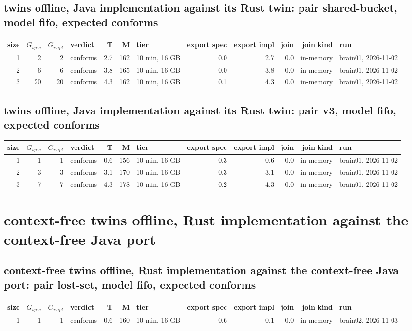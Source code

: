 \documentclass[10pt]{article}
\begin{document}
\subsection*{twins offline, Java implementation against its Rust twin: pair \textsf{shared-bucket}, model fifo, expected conforms}
\begin{longtable}{@{}rrrlrrlrrrrl@{}}
\toprule
size & $G_{\mathit{spec}}$ & $G_{\mathit{impl}}$ & verdict & T & M & tier & export spec & export impl & join & join kind & run \\
\midrule
\endhead
\color{red} 1 & 2 & 2 & conforms & 2.7 & 162 & 10 min, 16 GB & 0.0 & 2.7 & 0.0 & in-memory & brain01, 2026-11-02 \\
\color{red} 2 & 6 & 6 & conforms & 3.8 & 165 & 10 min, 16 GB & 0.0 & 3.8 & 0.0 & in-memory & brain01, 2026-11-02 \\
\color{red} 3 & 20 & 20 & conforms & 4.3 & 162 & 10 min, 16 GB & 0.1 & 4.3 & 0.0 & in-memory & brain01, 2026-11-02 \\
\bottomrule
\end{longtable}
\subsection*{twins offline, Java implementation against its Rust twin: pair \textsf{v3}, model fifo, expected conforms}
\begin{longtable}{@{}rrrlrrlrrrrl@{}}
\toprule
size & $G_{\mathit{spec}}$ & $G_{\mathit{impl}}$ & verdict & T & M & tier & export spec & export impl & join & join kind & run \\
\midrule
\endhead
\color{red} 1 & 1 & 1 & conforms & 0.6 & 156 & 10 min, 16 GB & 0.3 & 0.6 & 0.0 & in-memory & brain01, 2026-11-02 \\
\color{red} 2 & 3 & 3 & conforms & 3.1 & 170 & 10 min, 16 GB & 0.3 & 3.1 & 0.0 & in-memory & brain01, 2026-11-02 \\
\color{red} 3 & 7 & 7 & conforms & 4.3 & 178 & 10 min, 16 GB & 0.2 & 4.3 & 0.0 & in-memory & brain01, 2026-11-02 \\
\bottomrule
\end{longtable}
\section*{context-free twins offline, Rust implementation against the context-free Java port}
\subsection*{context-free twins offline, Rust implementation against the context-free Java port: pair \textsf{lost-set}, model fifo, expected conforms}
\begin{longtable}{@{}rrrlrrlrrrrl@{}}
\toprule
size & $G_{\mathit{spec}}$ & $G_{\mathit{impl}}$ & verdict & T & M & tier & export spec & export impl & join & join kind & run \\
\midrule
\endhead
\color{red} 1 & 1 & 1 & conforms & 0.6 & 160 & 10 min, 16 GB & 0.6 & 0.1 & 0.0 & in-memory & brain02, 2026-11-03 \\
\bottomrule
\end{longtable}
\end{document}
